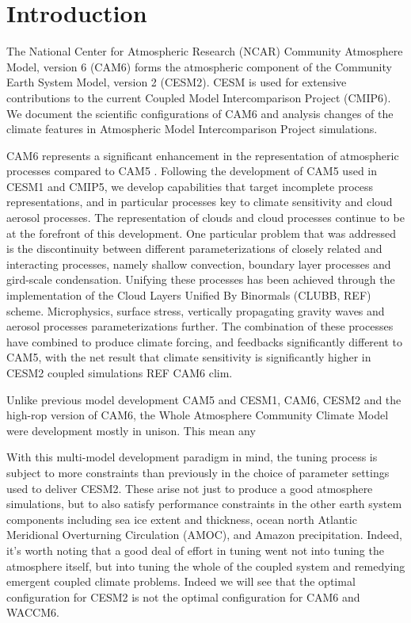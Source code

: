\section{Introduction}
\label{sec:intro}

The National Center for Atmospheric Research (NCAR) Community Atmosphere Model, version 6 (CAM6) forms the atmospheric component of the Community Earth System Model, version 2 (CESM2). CESM is used for extensive contributions to the current Coupled Model Intercomparison Project (CMIP6). We document the scientific configurations of CAM6 and analysis changes of the climate features in Atmospheric Model Intercomparison Project \citep[AMIP,][]{Gates1992a} simulations.

CAM6 represents a significant enhancement in the representation of atmospheric processes compared to CAM5  \citep[][]{Neale2012}. Following the development of CAM5 used in CESM1 and CMIP5, we develop capabilities that target incomplete process representations, and in particular processes key to climate sensitivity and cloud aerosol processes. The representation of clouds and cloud processes continue to be at the forefront of this development. One particular problem that was addressed is the discontinuity between different parameterizations of closely related and interacting processes, namely shallow convection, boundary layer processes and gird-scale condensation. Unifying these processes has been achieved through the implementation of the Cloud Layers Unified By Binormals (CLUBB, REF) scheme. Microphysics, surface stress, vertically propagating gravity waves and aerosol processes parameterizations further. The combination of these processes have combined to produce climate forcing, and feedbacks significantly different to CAM5, with the net result that climate sensitivity is significantly higher in CESM2 coupled simulations REF CAM6 clim. 




Unlike previous model development CAM5 and CESM1, CAM6, CESM2 and the high-rop version of CAM6, the Whole Atmosphere Community Climate Model were development mostly in unison. This mean any 

With this multi-model development paradigm in mind, the tuning process is subject to more constraints than previously in the choice of parameter settings used to deliver CESM2. These arise not just to produce a good atmosphere simulations, but to also satisfy performance constraints in the other earth system components including sea ice extent and thickness, ocean north Atlantic Meridional Overturning Circulation (AMOC), and Amazon precipitation. Indeed, it's worth noting that a good deal of effort in tuning went not into tuning the atmosphere itself, but into tuning the whole of the coupled system and remedying emergent coupled climate problems. Indeed we will see that the optimal configuration for CESM2 is not the optimal configuration for CAM6 and WACCM6.


